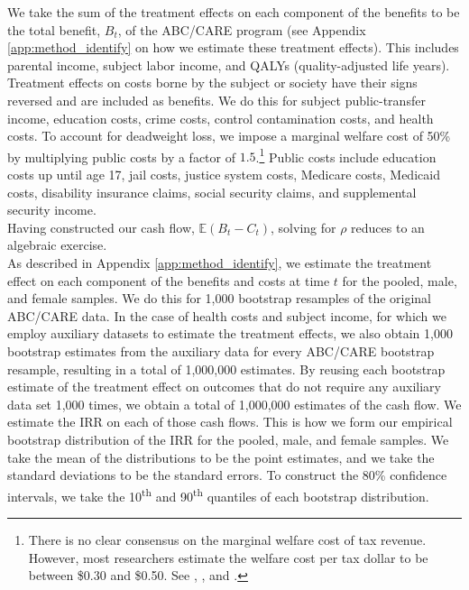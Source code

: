\noindent We take the sum of the treatment effects on each component of the benefits to
be the total benefit, $B_t$, of the ABC/CARE program (see Appendix \ref{app:method_identify} on how
we estimate these treatment effects). This includes parental income, subject labor income, and QALYs
(quality-adjusted life years).
Treatment effects on costs borne by the subject or society have their signs
reversed and are included as benefits. We do this for subject public-transfer income,
education costs, crime costs,
control contamination costs, and health costs. To account for deadweight loss, we
impose a marginal welfare cost of 50\% by multiplying public costs by a factor of
$1.5$.\footnote{There is no clear consensus on the marginal welfare cost of tax revenue. However,
most researchers estimate the welfare cost per tax dollar to be between \$0.30 and \$0.50. See
\citet{Feldstein_1999_REStat}, \citet{Heckman_Smith_1998_evaluating}, and \citet{Browning_1987_AER}.} Public costs include education costs up until age 17, jail costs, justice system costs, Medicare costs,
Medicaid costs, disability insurance claims, social security claims, and supplemental security
income. \\

\noindent Having constructed our cash flow, $\mathbb{E} (B_t - C_t)$, solving for $\rho$
reduces to an algebraic exercise. \\

\noindent As described in Appendix \ref{app:method_identify}, we estimate the treatment effect on each
component of the benefits and costs at time $t$ for the pooled, male, and
female samples. We do this for 1,000 bootstrap resamples of the original ABC/CARE data.
In the case of health costs and subject income, for which we employ auxiliary datasets to
estimate the treatment effects, we also obtain 1,000 bootstrap estimates from the auxiliary data
for every ABC/CARE bootstrap resample, resulting in a total of 1,000,000 estimates.
By reusing each bootstrap estimate of the treatment effect on outcomes that do not require any auxiliary data
set 1,000 times, we obtain a total of 1,000,000 estimates of the cash flow.
We estimate the IRR on each of those cash flows.
This is how we form our empirical bootstrap distribution of the IRR for the pooled, male, and female samples.
We take the mean of the distributions to be the point estimates, and we take the standard deviations
to be the standard errors. To construct the 80\% confidence intervals, we take the 10\textsuperscript{th}
and 90\textsuperscript{th} quantiles of each bootstrap distribution. \\

